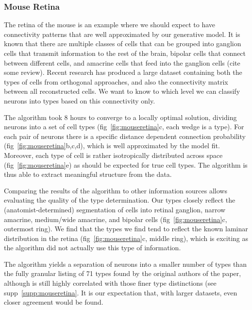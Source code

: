 \documentclass{article}
\begin{document}
\subsubsection{Mouse Retina}
The retina of the mouse \autocite{Masland2001} is an example where we
should expect to have connectivity patterns that are well approximated
by our generative model. It is known that there are multiple classes
of cells that can be grouped into ganglion cells that transmit
information to the rest of the brain, bipolar cells that connect
between different cells, and amacrine cells that feed into the
ganglion cells (cite some review). Recent research \autocite{Helmstaedter2013} has
produced a large dataset containing both the types of cells from
orthogonal approaches, and also the connectivity matrix between all
reconstructed cells. We want to know to which level we can classify
neurons into types based on this connectivity only.

The algorithm took 8 hours to converge to a locally optimal solution,
dividing neurons into a set of cell types (fig~\ref{fig:mouseretina}c, each
wedge is a type). For each pair of neurons there is a specific
distance dependent connection probability (fig~\ref{fig:mouseretina}b,c,d),
which is well approximated by the model fit. Moreover, each type of
cell is rather isotropically distributed across space
(fig~\ref{fig:mouseretina}e) as should be expected for true cell types. The
algorithm is thus able to extract meaningful structure from the data.

Comparing the results of the algorithm to other information sources
allows evaluating the quality of the type determination. Our types
closely reflect the (anatomist-determined) segmentation of cells into
retinal ganglion, narrow amacrine, medium/wide amacrine, and bipolar
cells (fig~\ref{fig:mouseretina}c, outermost ring). We find that the
types we find tend to reflect the known laminar distribution in the
retina (fig~\ref{fig:mouseretina}c, middle ring), which is exciting as
the algorithm did not actually use this type of information.


The algorithm yields a separation of neurons into a smaller number of
types than the fully granular listing of 71 types found by the
original authors of the paper, although is still highly correlated
with those finer type distinctions (see
supp~\ref{supp:mouseretina}. It is our expectation that, with larger
datasets, even closer agreement would be found.

\end{document}
